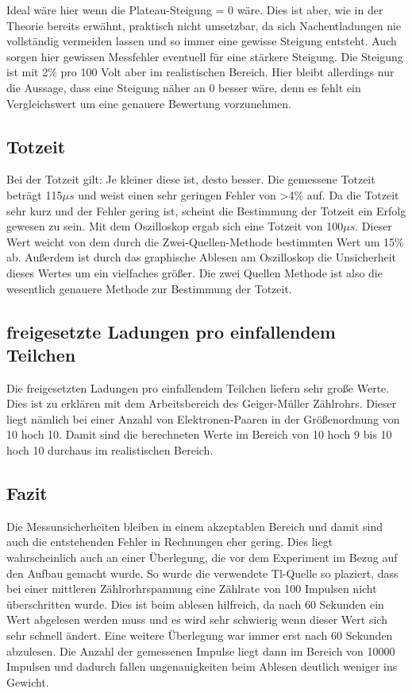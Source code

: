 Ideal wäre hier wenn die Plateau-Steigung = 0 wäre.
Dies ist aber, wie in der Theorie bereits erwähnt,
praktisch nicht umsetzbar,
da sich Nachentladungen nie vollständig vermeiden lassen 
und so immer eine gewisse Steigung entsteht.
Auch sorgen hier gewissen Messfehler eventuell für eine stärkere Steigung.
Die Steigung ist mit 2$\%$ pro 100 Volt aber im realistischen Bereich.
Hier bleibt allerdings nur die Aussage, dass eine Steigung näher an 0 besser wäre,
denn es fehlt ein Vergleichswert um eine genauere Bewertung vorzunehmen.

\subsection{Totzeit}

Bei der Totzeit gilt: Je kleiner diese ist, desto besser.
Die gemessene Totzeit beträgt 115$\mu s$ 
und weist einen sehr geringen Fehler von >4$\%$ auf.
Da die Totzeit sehr kurz und der Fehler gering ist,
scheint die Bestimmung der Totzeit ein Erfolg gewesen zu sein.
Mit dem Oszilloskop ergab sich eine Totzeit von 100$\mu s$.
Dieser Wert weicht von dem durch die Zwei-Quellen-Methode bestimmten Wert um 15\% ab.
Außerdem ist durch das graphische Ablesen am Oszilloskop die Unsicherheit dieses Wertes um ein vielfaches größer.
Die zwei Quellen Methode ist also die wesentlich genauere Methode zur Bestimmung der Totzeit.

\subsection{freigesetzte Ladungen pro einfallendem Teilchen}

Die freigesetzten Ladungen pro einfallendem Teilchen liefern sehr große Werte.
Dies ist zu erklären mit dem Arbeitsbereich des Geiger-Müller Zählrohrs.
Dieser liegt nämlich bei einer Anzahl von Elektronen-Paaren in der Größenordnung von 10 hoch 10.
Damit sind die berechneten Werte im Bereich von 10 hoch 9 bis 10 hoch 10 durchaus im realistischen Bereich.

\subsection{Fazit}

Die Messunsicherheiten bleiben in einem akzeptablen Bereich und damit sind auch die entstehenden Fehler in Rechnungen eher gering.
Dies liegt wahrscheinlich auch an einer Überlegung, die vor dem Experiment im Bezug auf den Aufbau gemacht wurde.
So wurde die verwendete Tl-Quelle so plaziert, 
dass bei einer mittleren Zählrorhrspannung eine Zählrate von 100 Impulsen nicht überschritten wurde.
Dies ist beim ablesen hilfreich, da nach 60 Sekunden ein Wert abgelesen werden muss
und es wird sehr schwierig wenn dieser Wert sich sehr schnell ändert.
Eine weitere Überlegung war immer erst nach 60 Sekunden abzulesen.
Die Anzahl der gemessenen Impulse liegt dann im Bereich von 10000 Impulsen
und dadurch fallen ungenauigkeiten beim Ablesen deutlich weniger ins Gewicht.

